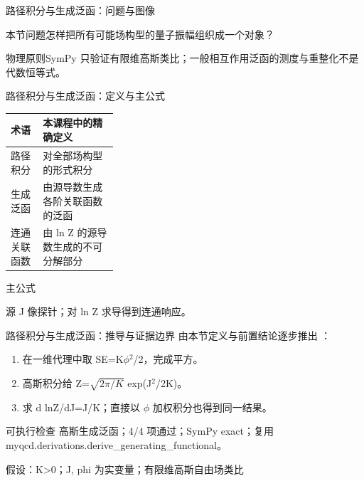 \begin{frame}[t]{路径积分与生成泛函：问题与图像}
\footnotesize
\begin{block}{本节问题}怎样把所有可能场构型的量子振幅组织成一个对象？\end{block}
\begin{block}{物理原则}\quad SymPy 只验证有限维高斯类比；一般相互作用泛函的测度与重整化不是代数恒等式。\end{block}
\end{frame}

\begin{frame}[t]{路径积分与生成泛函：定义与主公式}
\footnotesize\begin{tabularx}{\linewidth}{p{0.30\linewidth}Y}
\toprule 术语 & 本课程中的精确定义\\\midrule
{} 路径积分 & 对全部场构型的形式积分\\
 生成泛函 & 由源导数生成各阶关联函数的泛函\\
 连通关联函数 & 由 ln Z 的源导数生成的不可分解部分\\
\bottomrule\end{tabularx}\vspace{0.15cm}
\begin{block}{ 主公式}\centering{}\end{block}
源 J 像探针；对 ln Z 求导得到连通响应。
\end{frame}

\begin{frame}[t]{路径积分与生成泛函：推导与证据边界}
\footnotesize
{}\quad 由本节定义与前置结论逐步推出 ：
\begin{enumerate}
\item 在一维代理中取 SE=K\ensuremath{\phi}\ensuremath{^{2}}/\allowbreak{}2，完成平方。
\item 高斯积分给 Z=\ensuremath{\sqrt{2\pi/K}} exp(J\ensuremath{^{2}}/\allowbreak{}2K)。
\item 求 d lnZ/\allowbreak{}dJ=J/\allowbreak{}K；直接以 \ensuremath{\phi} 加权积分也得到同一结果。
\end{enumerate}\begin{block}{可执行检查}
\quad 高斯生成泛函；4/4 项通过；SymPy exact；复用 myqcd.derivations.derive\_generating\_functional。
\par\scriptsize 假设：K>0；J, phi 为实变量；有限维高斯自由场类比
\end{block}
\end{frame}

